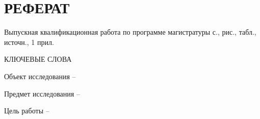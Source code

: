 \chapter*{\hfill РЕФЕРАТ\hfill}

Выпускная квалификационная работа по программе магистратуры \pageref{LastPage} с., \totalfigures{} рис., \totaltables{} табл., \totalmycitecounts{}  источн., 1 прил.
	
\noindent КЛЮЧЕВЫЕ СЛОВА

Объект исследования – 

Предмет исследования – 

Цель работы – 